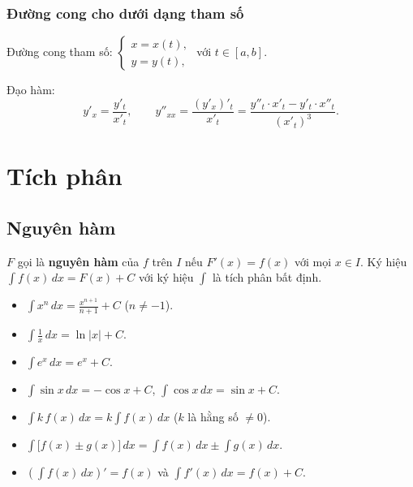 \documentclass[12pt,a4paper]{article}
\begin{document}
\subsubsection{Đường cong cho dưới dạng tham số}

\begin{dinhnghia}
  Đường cong tham số: $\begin{cases} x = x(t), \\ y = y(t), \end{cases}$ với $t \in [a,b]$.

  Đạo hàm:
  \[
    y'_x = \frac{y'_t}{x'_t}, \qquad y''_{xx} = \frac{(y'_x)'_t}{x'_t} = \frac{y''_t \cdot x'_t - y'_t \cdot x''_t}{(x'_t)^3}.
  \]
\end{dinhnghia}

\section{Tích phân}

\subsection{Nguyên hàm}

\begin{dinhnghia}
  $F$ gọi là \textbf{nguyên hàm} của $f$ trên $I$ nếu $F'(x) = f(x)$ với mọi $x \in I$. Ký hiệu $\displaystyle\int f(x)\,dx = F(x) + C$ với ký hiệu $\displaystyle\int$ là tích phân bất định.
\end{dinhnghia}

\begin{congthuc}[title={Nguyên hàm cơ bản}]
  \begin{itemize}
    \item $\displaystyle\int x^n\,dx = \frac{x^{n+1}}{n+1} + C$ ($n \ne -1$).
    \item $\displaystyle\int \frac{1}{x}\,dx = \ln|x| + C$.
    \item $\displaystyle\int e^x\,dx = e^x + C$.
    \item $\displaystyle\int \sin x\,dx = -\cos x + C$, $\displaystyle\int \cos x\,dx = \sin x + C$.
  \end{itemize}
\end{congthuc}

\begin{tinhchat}[title={Tính chất nguyên hàm}]
  \begin{itemize}
    \item $\displaystyle\int k\,f(x)\,dx = k\int f(x)\,dx$ \quad ($k$ là hằng số $\ne 0$).
    \item $\displaystyle\int \bigl[f(x) \pm g(x)\bigr]\,dx = \int f(x)\,dx \pm \int g(x)\,dx$.
    \item $\displaystyle\left(\int f(x)\,dx\right)' = f(x)$ và $\displaystyle\int f'(x)\,dx = f(x) + C$.
  \end{itemize}
\end{tinhchat}
\end{document}
